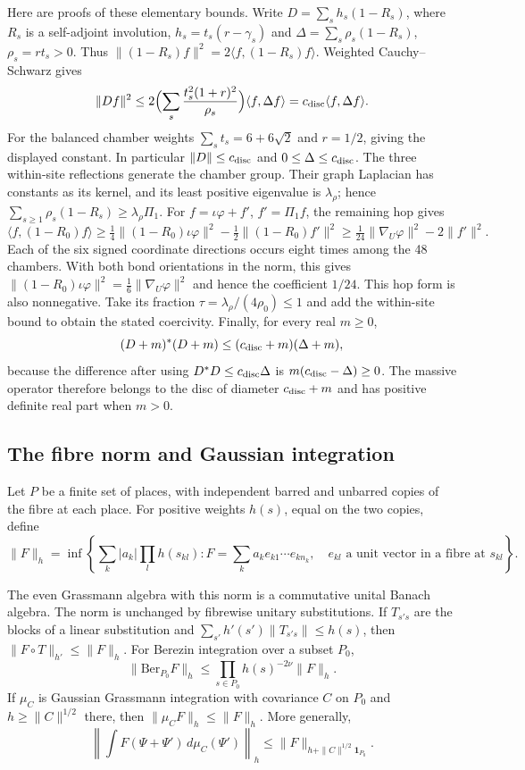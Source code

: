 \documentclass[11pt,letterpaper,reqno]{amsart}
\makeatletter
\theoremstyle{definition}
\newcommand{\ms@minorstart}{%
  \pushQED{\qed}\renewcommand{\qedsymbol}{$\blacksquare$}}
\newenvironment{lemma}[1][]{\ms@minorstart\ms@lemma[#1]}
  {\popQED\endms@lemma}
\theoremstyle{remark}
\makeatother
\begin{document}
Here are proofs of these elementary bounds.  Write
$D=\sum_sh_s(1-R_s)$, where $R_s$ is a self-adjoint
involution, $h_s=t_s(r-\gamma_s)$ and
$\Delta=\sum_s\rho_s(1-R_s)$, $\rho_s=rt_s>0$.
Thus $\|(1-R_s)f\|^2=2\langle f,(1-R_s)f\rangle$.
Weighted Cauchy--Schwarz gives
\[
 \|Df\|^2\le
 2\Bigl(\sum_s\frac{t_s^2(1+r)^2}{\rho_s}\Bigr)
                    \langle f,\Delta f\rangle
 =c_{\rm disc}\langle f,\Delta f\rangle.
\]
For the balanced chamber weights
$\sum_st_s=6+6\sqrt2$ and $r=1/2$, giving the displayed
constant.  In particular $\|D\|\le c_{\rm disc}$ and
$0\le\Delta\le c_{\rm disc}$.
The three within-site reflections generate the chamber group.
Their graph Laplacian has constants as its kernel, and
its least positive eigenvalue is $\lambda_\rho$; hence
$\sum_{s\ge1}\rho_s(1-R_s)\ge\lambda_\rho\Pi_1$.
For $f=\iota\varphi+f'$, $f'=\Pi_1f$, the remaining hop gives
\[
 \langle f,(1-R_0)f\rangle
 \ge\tfrac14\|(1-R_0)\iota\varphi\|^2
                      -\tfrac12\|(1-R_0)f'\|^2
 \ge\tfrac1{24}\|\nabla_U\varphi\|^2-2\|f'\|^2.
\]
Each of the six signed coordinate directions occurs eight times
among the 48 chambers. With both bond orientations in the norm, this gives
$\|(1-R_0)\iota\varphi\|^2=\tfrac16\|\nabla_U\varphi\|^2$
and hence the coefficient $1/24$. This hop form is also
nonnegative.  Take its fraction
$\tau=\lambda_\rho/(4\rho_0)\le1$ and add the within-site
bound to obtain the stated coercivity.
Finally, for every real $m\ge0$,
\[
 (D+m)^*(D+m)\le(c_{\rm disc}+m)(\Delta+m),
\]
because the difference after using $D^*D\le c_{\rm disc}\Delta$
is $m(c_{\rm disc}-\Delta)\ge0$.  The massive operator
therefore belongs to the disc of diameter $c_{\rm disc}+m$
and has positive definite real part when $m>0$.

\subsection{The fibre norm and Gaussian integration}

Let $P$ be a finite set of places, with independent barred and unbarred
copies of the fibre at each place.  For positive weights $h(s)$, equal
on the two copies, define
\[
 \|F\|_h=\inf\left\{\sum_k|a_k|\prod_lh(s_{kl}):
 F=\sum_ka_ke_{k1}\cdots e_{kn_k},\quad
 e_{kl}\text{ a unit vector in a fibre at }s_{kl}\right\}.
\]

\begin{lemma}[The fibre norm]\label{C-387-18}
The even Grassmann algebra with this norm is a commutative unital
Banach algebra.  The norm is unchanged by fibrewise unitary
substitutions.  If $T_{s's}$ are the blocks of a linear substitution
and $\sum_{s'}h'(s')\|T_{s's}\|\le h(s)$, then
$\|F\circ T\|_{h'}\le\|F\|_h$.
For Berezin integration over a subset $P_0$,
\[
 \|\mathrm{Ber}_{P_0}F\|_h\le
     \prod_{s\in P_0}h(s)^{-2\nu}\|F\|_h.
\]
If $\mu_C$ is Gaussian Grassmann integration with covariance $C$ on
$P_0$ and $h\ge\|C\|^{1/2}$ there, then
$\|\mu_CF\|_h\le\|F\|_h$.  More generally,
\[
 \left\|\int F(\Psi+\Psi')\,d\mu_C(\Psi')\right\|_h
 \le\|F\|_{h+\|C\|^{1/2}\mathbf1_{P_0}}.
\]
\end{lemma}
\end{document}
